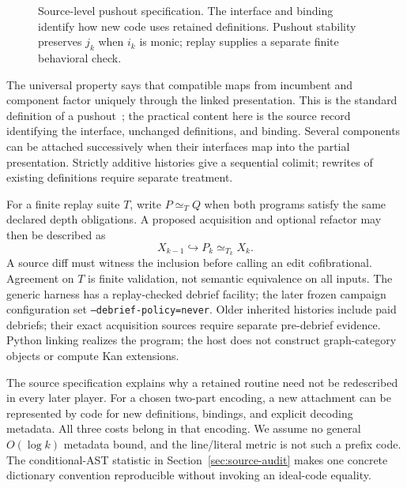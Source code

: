 \documentclass[11pt]{article}
\theoremstyle{definition}
\theoremstyle{remark}
\begin{document}
\begin{figure}[H]
\centering
{}
\caption{Source-level pushout specification. The interface and binding identify how
new code uses retained definitions. Pushout stability preserves $j_k$ when $i_k$
is monic; replay supplies a separate finite behavioral check.}
\label{fig:inverse-colimit-pushout}
\end{figure}

The universal property says that compatible maps from incumbent and component
factor uniquely through the linked presentation. This is the standard definition
of a pushout~\cite{maclane1998,riehl2016category}; the practical content here is
the source record identifying the interface, unchanged definitions, and binding.
Several components can be attached successively when their interfaces map into
the partial presentation. Strictly additive histories give a sequential colimit;
rewrites of existing definitions require separate treatment.

For a finite replay suite $T$, write $P\simeq_TQ$ when both programs satisfy the
same declared depth obligations. A proposed acquisition and optional refactor may
then be described as
\begin{equation}
 X_{k-1}\hookrightarrow P_k\simeq_{T_k}X_k.
 \label{eq:cofibration-refactor-factorization}
\end{equation}
A source diff must witness the inclusion before calling an edit cofibrational.
Agreement on $T$ is finite validation, not semantic equivalence on all inputs.
The generic harness has a replay-checked debrief facility; the later frozen campaign
configuration set \texttt{--debrief-policy=never}. Older inherited histories include
paid debriefs; their exact acquisition sources require separate pre-debrief evidence. Python linking realizes the program; the host does
not construct graph-category objects or compute Kan extensions.

The source specification explains why a retained routine need not be redescribed
in every later player. For a chosen two-part encoding, a new attachment can be
represented by code for new definitions, bindings, and explicit decoding metadata.
All three costs belong in that encoding. We assume no general $O(\log k)$ metadata
bound, and the line/literal metric is not such a prefix code. The conditional-AST
statistic in Section~\ref{sec:source-audit} makes one concrete dictionary convention
reproducible without invoking an ideal-code equality.
\end{document}
